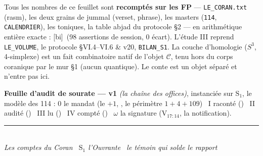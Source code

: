 \documentclass[10pt]{article}
\newcommand{\Sx}[1]{\ensuremath{\mathrm{S}_{#1}}}
\newcommand{\Vx}[1]{\ensuremath{\mathrm{V}_{#1}}}
\newcommand{\bi}{{\ttfamily\footnotesize\color{credit!75!ink}[bi]}}
\newcommand{\srub}[1]{\smallskip{\sffamily\bfseries\color{ink}#1}\par}
\begin{document}
\srub{Provenance}
{\footnotesize Tous les nombres de ce feuillet sont \textbf{recompt\'es sur les FP} — \texttt{LE\_CORAN.txt} (rasm), les deux grains de jummal (verset, phrase), les masters (\texttt{114}, \texttt{CALENDRIER}), les toniques, la table abjad du protocole §2 — en arithm\'etique enti\`ere exacte : \bi\ (98 assertions de session, 0 \'ecart). L'\'etude III reprend \texttt{LE\_VOLUME}, le protocole §VI.4--VI.6 \& v20, \texttt{BILAN\_S1}. La couche d'homologie ($S^3$, 4-simplexe) est un fait combinatoire natif de l'objet $\mathcal C$, tenu hors du corps coranique par le mur §1 (aucun quantique). Le conte est un objet s\'epar\'e et n'entre pas ici.}

\begin{center}\footnotesize\color{shadow}
\textbf{Feuille d'audit de sourate — v1} \emph{(la cha\^ine des offices)}, instanci\'ee sur \Sx{1}, le mod\`ele des 114 : 0 le mandat (le $+1$, , le p\'erim\`etre $1{+}4{+}109$) \textperiodcentered\ I racont\'e () \textperiodcentered\ II audit\'e () \textperiodcentered\ III lu () \textperiodcentered\ IV compt\'e () \textperiodcentered\ $\omega$ la signature (\Vx{17:14}, la notification).
\end{center}

\vfill
\begin{center}{\color{gold!55}\rule{0.5\linewidth}{0.4pt}}\\[0.3em]
{\footnotesize\itshape\color{gold!70!ink} Les comptes du Coran \textperiodcentered\ \Sx{1} l'Ouvrante \textperiodcentered\ le t\'emoin qui solde le rapport}
\end{center}
\end{document}
